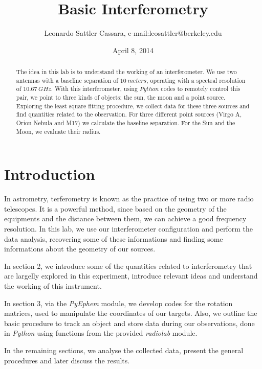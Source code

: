 \documentclass{article}
\begin{document}
\title{Basic Interferometry}
\author{Leonardo Sattler Cassara, e-mail:leosattler@berkeley.edu}
\date{April 8, 2014}
\maketitle

\begin{abstract}

The idea in this lab is to understand the working of an
interferometer. We use two antennas with a baseline separation of $10 \
meters$, operating with a spectral resolution of  $10.67 \ GHz$. With
this interferometer, using $Python$ codes to remotely control this pair,
we point to three kinds of objects: the sun, the moon and a point
source. Exploring the least square fitting procedure, we collect data for
these three sources and find quantities related to the observation. For
three different point sources (Virgo A, Orion Nebula and M17) we calculate
the baseline separation. For the Sun and the Moon, we evaluate their
radius. 

\end{abstract}

\section{Introduction}

In astrometry, terferometry is known as the practice of using two or
more radio telescopes. It is a powerful method, since based on the
geometry of the equipments and the distance between them, we can achieve
a good frequency resolution. In this lab, we use our interferometer
configuration and perform the data analysis, recovering some of these
informations and finding some informations about the geometry of our sources.

In section 2, we introduce some of the quantities related to
interferometry that are largelly explored in this experiment, introduce
relevant ideas and
understand the working of this instrument. 

In section 3, via the \emph{PyEphem} module, we develop codes for the rotation
matrices, used to manipulate the coordinates of our targets. Also, we
outline the basic procedure to track an object and store data during our
observations, done in \emph{Python} using functions from the provided
\emph{radiolab} module.

In the remaining sections, we analyse the collected data, present the
general procedures and later discuss the results. 
\end{document}
